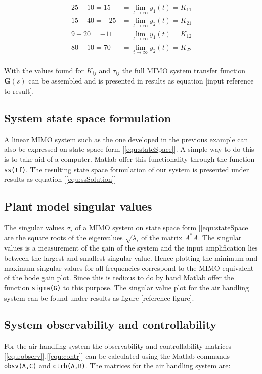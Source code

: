 \documentclass[a4paper, titlepage]{article}
\begin{document}
\begin{equation}
\begin{split}
25 - 10 = 15 &= 
\lim_{t \to \infty} y_{1}(t) = 
K_{11} \\
15 - 40 = -25 &= 
\lim_{t \to \infty} y_{2}(t) = 
K_{21} \\
9 - 20 = -11 &= 
\lim_{t \to \infty} y_{1}(t) = 
K_{12} \\
80 - 10 = 70 &= 
\lim_{t \to \infty} y_{2}(t) = 
K_{22} \\
\end{split}
\end{equation}

With the values found for $K_{ij}$ and $\tau_{ij}$ the full MIMO system transfer function $\boldsymbol{G}(s)$ can be assembled and is presented in results as equation [input reference to result].

\subsection{System state space formulation}
A linear MIMO system such as the one developed in the previous example can also be expressed on state space form [\ref{equ:stateSpace}].
A simple way to do this is to take aid of a computer.
Matlab offer this functionality through the function \verb|ss(tf)|.
The resulting state space formulation of our system is presented under results as equation [\ref{equ:ssSolution}]

\subsection{Plant model singular values}
The singular values $\sigma_i$ of a MIMO system on state space form [\ref{equ:stateSpace}] are the square roots of the eigenvalues $\sqrt{\lambda_i}$ of the matrix $A^*A$.
The singular values is a measurement of the gain of the system and the input amplification lies between the largest and smallest singular value.
Hence plotting the minimum and maximum singular values for all frequencies correspond to the MIMO equivalent of the bode gain plot.
Since this is tedious to do by hand Matlab offer the function \verb|sigma(G)| to this purpose.
The singular value plot for the air handling system can be found under results as figure [reference figure].

\subsection{System observability and controllability}
For the air handling system the observability and controllability matrices [\ref{equ:observ}],[\ref{equ:contr}] can be calculated using the Matlab commands \verb|obsv(A,C)| and \verb|ctrb(A,B)|.
The matrices for the air handling system are:
\end{document}
